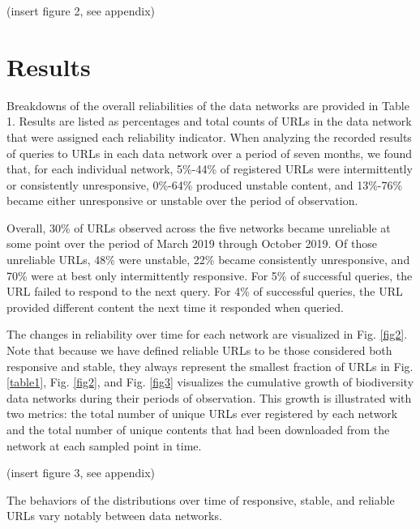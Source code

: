 \documentclass[12pt,letterpaper]{article}
\begin{document}
% 
(insert figure 2, see appendix)

\section*{Results}

Breakdowns of the overall reliabilities of the data networks are provided in Table 1. Results are listed as percentages and total counts of URLs in the data network that were assigned each reliability indicator. When analyzing the recorded results of queries to URLs in each data network over a period of seven months, we found that, for each individual network, 5\%-44\% of registered URLs were intermittently or consistently unresponsive, 0\%-64\% produced unstable content, and 13\%-76\% became either unresponsive or unstable over the period of observation.

Overall, 30\% of URLs observed across the five networks became unreliable at some point over the period of March 2019 through October 2019. Of those unreliable URLs, 48\% were unstable, 22\% became consistently unresponsive, and 70\% were at best only intermittently responsive. For 5\% of successful queries, the URL failed to respond to the next query. For 4\% of successful queries, the URL provided different content the next time it responded when queried.

The changes in reliability over time for each network are visualized in Fig. \ref{fig2}. Note that because we have defined reliable URLs to be those considered both responsive and stable, they always represent the smallest fraction of URLs in Fig. \ref{table1}, Fig. \ref{fig2}, and Fig. \ref{fig3} visualizes the cumulative growth of biodiversity data networks during their periods of observation. This growth is illustrated with two metrics: the total number of unique URLs ever registered by each network and the total number of unique contents that had been downloaded from the network at each sampled point in time.

% 
(insert figure 3, see appendix)


The behaviors of the distributions over time of responsive, stable, and reliable URLs vary notably between data networks. 
\end{document}
